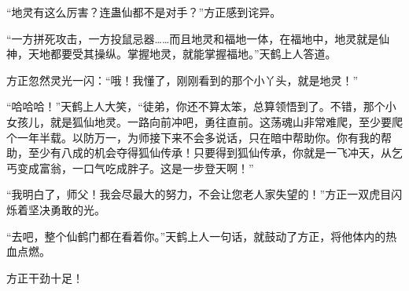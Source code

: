 \begin{this_body}
“地灵有这么厉害？连蛊仙都不是对手？”方正感到诧异。

“一方拼死攻击，一方投鼠忌器……而且地灵和福地一体，在福地中，地灵就是仙神，天地都要受其操纵。掌握地灵，就能掌握福地。”天鹤上人答道。

方正忽然灵光一闪：“哦！我懂了，刚刚看到的那个小丫头，就是地灵！”

“哈哈哈！”天鹤上人大笑，“徒弟，你还不算太笨，总算领悟到了。不错，那个小女孩儿，就是狐仙地灵。一路向前冲吧，勇往直前。这荡魂山非常难爬，至少要爬个一年半载。以防万一，为师接下来不会多说话，只在暗中帮助你。你有我的帮助，至少有八成的机会夺得狐仙传承！只要得到狐仙传承，你就是一飞冲天，从乞丐变成富翁，一口气吃成胖子。这是一步登天啊！”

“我明白了，师父！我会尽最大的努力，不会让您老人家失望的！”方正一双虎目闪烁着坚决勇敢的光。

“去吧，整个仙鹤门都在看着你。”天鹤上人一句话，就鼓动了方正，将他体内的热血点燃。

方正干劲十足！

\end{this_body}

